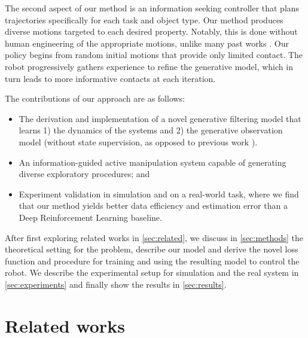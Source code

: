 \documentclass[anon]{l4dc2024}
\begin{document}
The second aspect of our method is an information seeking controller that plans trajectories specifically for each task and object type.
Our method produces diverse motions targeted to each desired property.
Notably, this is  done without  human engineering of the appropriate motions, unlike many past works \citep{swingbot, denil2016learning}.
Our policy begins from random initial motions that provide only limited contact. The robot progressively gathers experience to refine the generative model, which in turn leads to more informative contacts at each iteration.

The contributions of our approach are as follows:
\begin{itemize}
    \item The derivation and implementation of a novel generative filtering model that learns 1) the dynamics of the systems and 2) the generative observation model (without state supervision, as opposed to previous work \citep{bohgukf}).
    \item An information-guided active manipulation system capable of generating diverse exploratory procedures; and
    \item Experiment validation in simulation and on a real-world task, where we find that our method yields better data efficiency and estimation error than a Deep Reinforcement Learning baseline.
\end{itemize}


After first exploring related works in \autoref{sec:related}, we discuss in \autoref{sec:methods} the theoretical setting for the problem, describe our model and derive the novel loss function and procedure for training and using the resulting model to control the robot.
We describe the experimental setup for simulation and the real system in \autoref{sec:experiments} and finally show the results in \autoref{sec:results}.



\section{Related works}
\label{sec:related}
\end{document}
